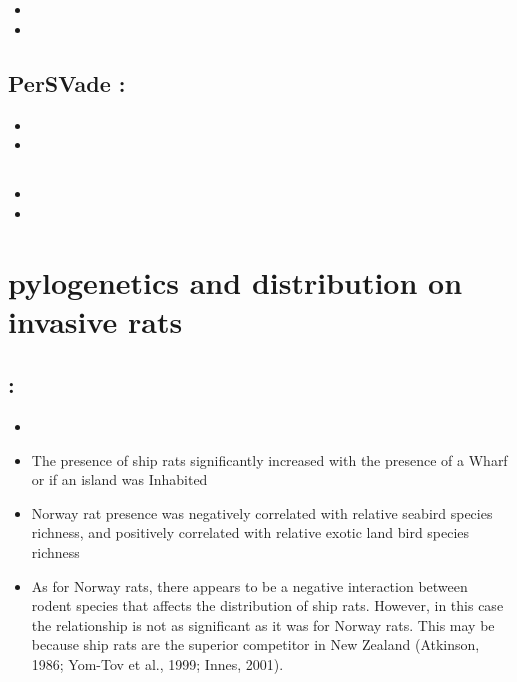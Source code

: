 \documentclass[document.tex]{subfiles}
\begin{document}
\section{ }
\subsection{}
\begin{itemize}
\item 
\item 
\end{itemize}

\subsection{PerSVade :}
\begin{itemize}
\item 
\item 
\end{itemize}

\subsection{}
\begin{itemize}
\item 
\item 
\end{itemize}


\section{pylogenetics and distribution on invasive rats}

    \subsection{ :}
    \begin{itemize}
    \item 
    \item The presence of ship rats significantly increased with the presence of a Wharf or if an island was Inhabited
    \item Norway rat presence was negatively correlated with relative seabird species richness, and positively correlated with relative exotic land bird species richness
    \item As for Norway rats, there appears to be a negative interaction between rodent species that affects the distribution of ship rats. However, in this case the relationship is not as significant as it was for Norway rats. This may be because ship rats are the superior competitor in New Zealand (Atkinson, 1986; Yom-Tov et al., 1999; Innes, 2001).
    \end{itemize}
\end{document}
